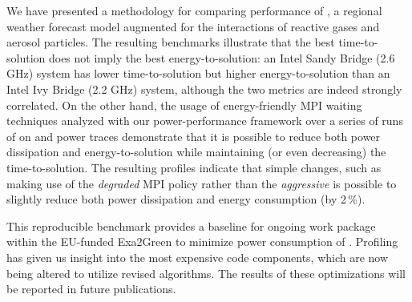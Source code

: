 We  have   presented  a  methodology  for   comparing  performance  of
\cosmoart,  a  regional  weather  forecast  model  augmented  for  the
interactions of  reactive gases and aerosol  particles.  The resulting
benchmarks illustrate  that the  best time-to-solution does  not imply
the best energy-to-solution: an Intel Sandy Bridge (2.6 GHz) system has
lower time-to-solution but higher energy-to-solution than an Intel Ivy
Bridge (2.2 GHz) system, although  the two metrics are indeed strongly
correlated.   On the  other  hand, the  usage  of energy-friendly  MPI
waiting techniques analyzed  with our power-per\-for\-man\-ce framework over
a series of  runs of \cosmoart on \tinto  and power traces demonstrate
that   it  is   possible  to   reduce  both   power   dissipation  and
energy-to-solution   while  maintaining   (or  even   decreasing)  the
time-to-solution. The resulting profiles indicate that simple changes,
such as making use of the  \emph{degraded} MPI policy rather than the \emph{aggressive}
is  possible to  slightly  reduce both  power  dissipation and  energy
consumption (by 2\,\%).

This  reproducible  benchmark provides  a  baseline  for ongoing  work
package within  the EU-funded Exa2Green to  minimize power consumption
of \cosmoart. Profiling  has given us insight into  the most expensive
code  components,  which are  now  being  altered  to utilize  revised
algorithms.  The  results of these  optimizations will be  reported in
future publications.
